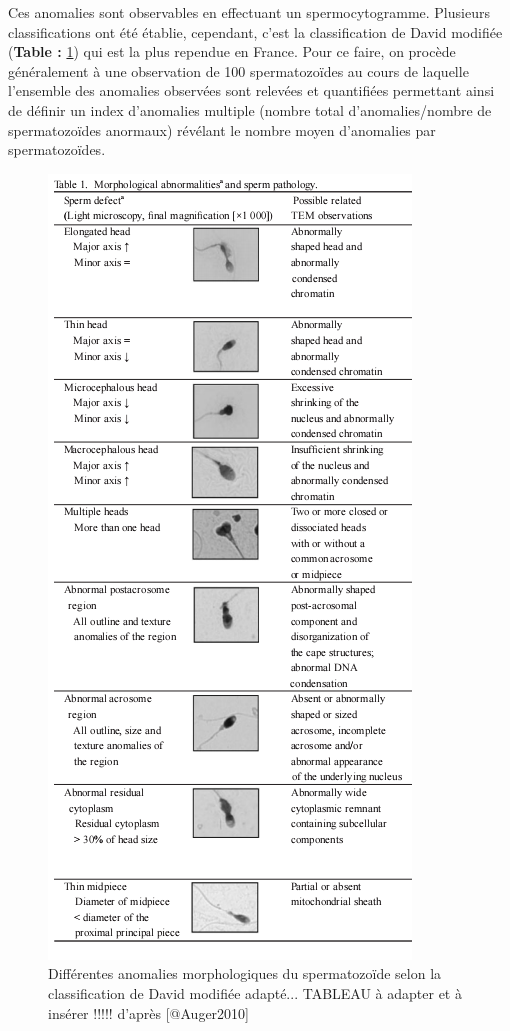 \documentclass[12pt,twoside]{reedthesis}
\theoremstyle{definition}
\theoremstyle{definition}
\theoremstyle{remark}
\begin{document}
  Ces anomalies sont observables en effectuant un spermocytogramme.
  Plusieurs classifications ont été établie, cependant, c'est la
  classification de David modifiée (\textbf{Table :}
  \ref{fig:anomaliemorphosperm}) qui est la plus rependue en France. Pour
  ce faire, on procède généralement à une observation de 100
  spermatozoïdes au cours de laquelle l'ensemble des anomalies observées
  sont relevées et quantifiées permettant ainsi de définir un index
  d'anomalies multiple (nombre total d'anomalies/nombre de spermatozoïdes
  anormaux) révélant le nombre moyen d'anomalies par spermatozoïdes.
  
  \begin{figure}
  
  {\centering \includegraphics[scale=.75]{figure/sperm_morpho_abnormalities} 
  
  }
  
  \caption[Différentes anomalies morphologiques du spermatozoïde selon la classification de David modifiée adapté... TABLEAU à adapter et à insérer !!!!!]{Différentes anomalies morphologiques du spermatozoïde selon la classification de David modifiée adapté... TABLEAU à adapter et à insérer !!!!! d'après [@Auger2010]}\label{fig:anomaliemorphosperm}
  \end{figure}
  
\end{document}
